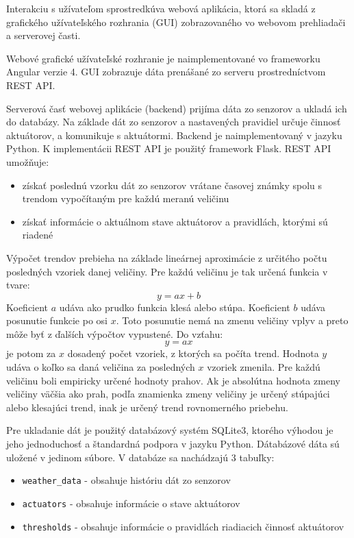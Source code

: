 \documentclass[11pt,a4paper]{article}
\begin{document}
Interakciu s užívateľom sprostredkúva webová aplikácia, ktorá sa skladá z grafického
užívateľského rozhrania (GUI) zobrazovaného vo webovom prehliadači a serverovej časti.

Webové grafické užívateľské rozhranie je naimplementované vo frameworku Angular verzie 4.
GUI zobrazuje dáta prenášané zo serveru prostredníctvom REST API.

Serverová časť webovej aplikácie (backend) prijíma dáta zo senzorov a ukladá ich do databázy.
Na základe dát zo senzorov a nastavených pravidiel určuje činnosť aktuátorov, a komunikuje s aktuátormi.
Backend je naimplementovaný v jazyku Python.
K implementácii REST API je použitý framework Flask.
REST API umožňuje:
\begin{itemize}
    \item získať poslednú vzorku dát zo senzorov vrátane časovej známky spolu s trendom vypočítaným
        pre každú meranú veličinu
    \item získať informácie o aktuálnom stave aktuátorov a pravidlách, ktorými sú riadené
\end{itemize}

Výpočet trendov prebieha na základe lineárnej aproximácie z určitého počtu posledných vzoriek danej veličiny.
Pre každú veličinu je tak určená funkcia v tvare:
\[
    y = a x + b
\]
Koeficient $a$ udáva ako prudko funkcia klesá alebo stúpa.
Koeficient $b$ udáva posunutie funkcie po osi $x$.
Toto posunutie nemá na zmenu veličiny vplyv a preto môže byť z ďalších výpočtov vypustené.
Do vzťahu:
\[
    y = a x
\]
je potom za $x$ dosadený počet vzoriek, z ktorých sa počíta trend.
Hodnota $y$ udáva o koľko sa daná veličina za posledných $x$ vzoriek zmenila.
Pre každú veličinu boli empiricky určené hodnoty prahov.
Ak je absolútna hodnota zmeny veličiny väčšia ako prah,
podľa znamienka zmeny veličiny je určený stúpajúci alebo klesajúci trend,
inak je určený trend rovnomerného priebehu.

Pre ukladanie dát je použitý databázový systém SQLite3, ktorého výhodou je jeho jednoduchosť
a štandardná podpora v jazyku Python.
Dátabázové dáta sú uložené v jedinom súbore.
V databáze sa nachádzajú 3 tabuľky:
\begin{itemize}
    \item \texttt{weather\_data} - obsahuje históriu dát zo senzorov
    \item \texttt{actuators} - obsahuje informácie o stave aktuátorov
    \item \texttt{thresholds} - obsahuje informácie o pravidlách riadiacich činnosť aktuátorov
\end{itemize}
\end{document}
